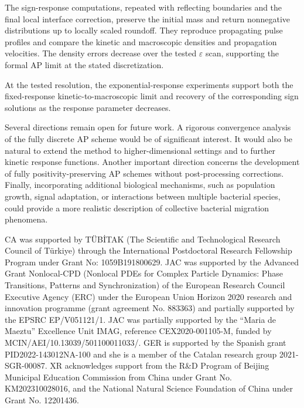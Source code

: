 \documentclass[11pt,twoside]{article}
\numberwithin{equation}{section}
\theoremstyle{plain}
\theoremstyle{nonumberplain}
\newif\ifrevisionred
\DeclareRobustCommand{\st}[1]{{\ifrevisionred\color{red}\fi #1}}
\begin{document}
\st{The sign-response computations, repeated with reflecting boundaries and the final local interface correction, preserve the initial mass and return nonnegative distributions up to locally scaled roundoff. They reproduce propagating pulse profiles and compare the kinetic and macroscopic densities and propagation velocities. The density errors decrease over the tested $\varepsilon$ scan, supporting the formal AP limit at the stated discretization.}

\st{At the tested resolution, the exponential-response experiments support both the fixed-response kinetic-to-macroscopic limit and recovery of the corresponding sign solutions as the response parameter decreases.}

Several directions remain open for future work. A rigorous convergence analysis of the fully discrete AP scheme would be of significant interest. \st{It would also be natural to extend the method to higher-dimensional settings and to further kinetic response functions.} Another important direction concerns the development of fully positivity-preserving AP schemes without post-processing corrections. Finally, incorporating additional biological mechanisms, such as population growth, signal adaptation, or interactions between multiple bacterial species, could provide a more realistic description of collective bacterial migration phenomena.



\bigskip
\enlargethispage{\baselineskip}
CA was supported by TÜBİTAK (The Scientific and Technological Research Council of Türkiye) through the International Postdoctoral Research Fellowship Program under Grant No: 1059B191800629.
JAC was supported by the Advanced Grant Nonlocal-CPD (Nonlocal PDEs for Complex Particle Dynamics: Phase Transitions, Patterns and Synchronization) of the European Research Council Executive Agency (ERC) under the European Union Horizon 2020 research and innovation programme (grant agreement No. 883363) and  partially supported by the EPSRC EP/V051121/1. JAC was partially supported by the ``Maria de Maeztu'' Excellence Unit IMAG, reference CEX2020-001105-M, funded by MCIN/AEI/10.13039/501100011033/.
GER is supported by the Spanish grant PID2022-143012NA-100 and she is a member of the Catalan research group 2021-SGR-00087.
XR acknowledges support from the R\&D Program of Beijing Municipal Education Commission from China under Grant No.  KM202310028016, and the National Natural Science Foundation of China under Grant No. 12201436. 
\end{document}
